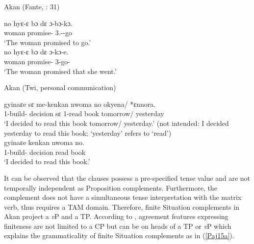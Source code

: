 \documentclass[output=paper]{langscibook}
\begin{document}
\begin{exe}
\ex \label{Paj14} Akan (Fante, \citealt{osam1998}: 31)
\begin{xlist}

\ex \label{Paj14a} 
 {no} {hy{ɛ}-{ɛ} b{ɔ}} {d{ɛ}} {{ɔ}-b{ɔ}-k{ɔ}}. \\
   woman  promise-{\compl} {\comp} 3{\sg}.{\subj}--go\\
\glt `The woman promised to go.’\\

\ex \label{Paj14b} 
 {no} {hy{ɛ}-{ɛ} b{ɔ}} {d{ɛ}} {{ɔ}-k{ɔ}-e}. \\
    woman  promise-{\compl} {\comp} 3{\sg}-go-{\comp}\\
\glt `The woman promised that she went.’\\

\end{xlist}
\end{exe}
 
\newpage
\begin{exe}
\ex \label{Paj15} Akan (Twi, personal communication)
\begin{xlist}

\ex \label{Paj15a} 
 {gyina{ɛ}e} {s{ɛ}} {me-kenkan} {nwoma} {no} {okyena}/ {*{ɛ}nnora.}\\
   1{\sg}-build-{\compl} decision s{ɛ} 1{\sg}-read book  tomorrow/ yesterday\\
\glt `I decided to read this book tomorrow/ yesterday.’ (not intended: I decided yesterday to read this book; `yesterday' refers to `read')\\

\ex \label{Paj15b} 
 {gyina{ɛ}e} {kenkan} {nwoma} {no}. \\
     1{\sg}-build-{\compl} decision read book \\
\glt `I decided to read this book.’\\

\end{xlist}
\end{exe}
 

It can be observed that the clauses possess a pre-specified tense value and are not temporally independent as Proposition complements. Furthermore, the complement does not have a simultaneous tense interpretation with the matrix verb, thus requires a TAM domain. Therefore, finite Situation complements in Akan project a \emph{v}P and a TP. According to \citet{adger2007}, agreement features expressing finiteness are not limited to a CP but can be on heads of a TP or \emph{v}P which explains the grammaticality of finite Situation complements as in (\ref{Paj15a}). 
	
\end{document}
